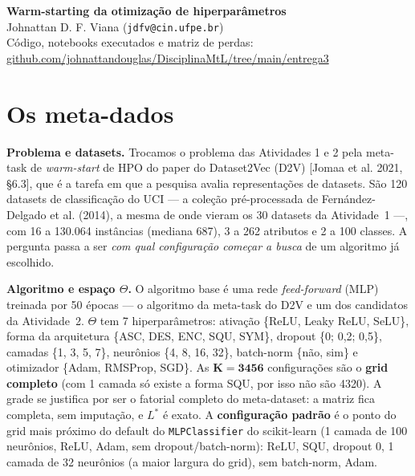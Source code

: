 \documentclass[10pt,a4paper]{article}
\begin{document}
\begin{center}
{\Large\bfseries Warm-starting da otimização de hiperparâmetros}\\[4pt]
Johnattan D. F. Viana (\texttt{jdfv@cin.ufpe.br})\\[1pt]
{\small Código, notebooks executados e matriz de perdas:
\href{https://github.com/johnattandouglas/DisciplinaMtL/tree/main/entrega3}{github.com/johnattandouglas/DisciplinaMtL/tree/main/entrega3}}
\end{center}

\section{Os meta-dados}

\textbf{Problema e datasets.} Trocamos o problema das Atividades 1 e 2 pela meta-task de \textit{warm-start} de HPO do paper do
Dataset2Vec (D2V) [Jomaa et al. 2021, \S6.3], que é a tarefa em que a pesquisa avalia representações de datasets. São 120
datasets de classificação do UCI --- a coleção pré-processada de Fernández-Delgado et al. (2014), a mesma de onde vieram os 30
datasets da Atividade~1 ---, com 16 a 130.064 instâncias (mediana 687), 3 a 262 atributos e 2 a 100 classes. A pergunta passa a
ser \textit{com qual configuração começar a busca} de um algoritmo já escolhido.

\textbf{Algoritmo e espaço $\Theta$.} O algoritmo base é uma rede \textit{feed-forward} (MLP) treinada por 50 épocas --- o
algoritmo da meta-task do D2V e um dos candidatos da Atividade~2. $\Theta$ tem 7 hiperparâmetros: ativação \{ReLU, Leaky ReLU,
SeLU\}, forma da arquitetura \{ASC, DES, ENC, SQU, SYM\}, dropout \{0; 0,2; 0,5\}, camadas \{1, 3, 5, 7\}, neurônios \{4, 8, 16,
32\}, batch-norm \{não, sim\} e otimizador \{Adam, RMSProp, SGD\}. As $\boldsymbol{K = 3456}$ configurações são o \textbf{grid
completo} (com 1 camada só existe a forma SQU, por isso não são 4320). A grade se justifica por ser o fatorial completo do
meta-dataset: a matriz fica completa, sem imputação, e $L^*$ é exato. A \textbf{configuração padrão} é o ponto do grid mais
próximo do default do \texttt{MLPClassifier} do scikit-learn (1 camada de 100 neurônios, ReLU, Adam, sem dropout/batch-norm):
ReLU, SQU, dropout 0, 1 camada de 32 neurônios (a maior largura do grid), sem batch-norm, Adam.
\end{document}
